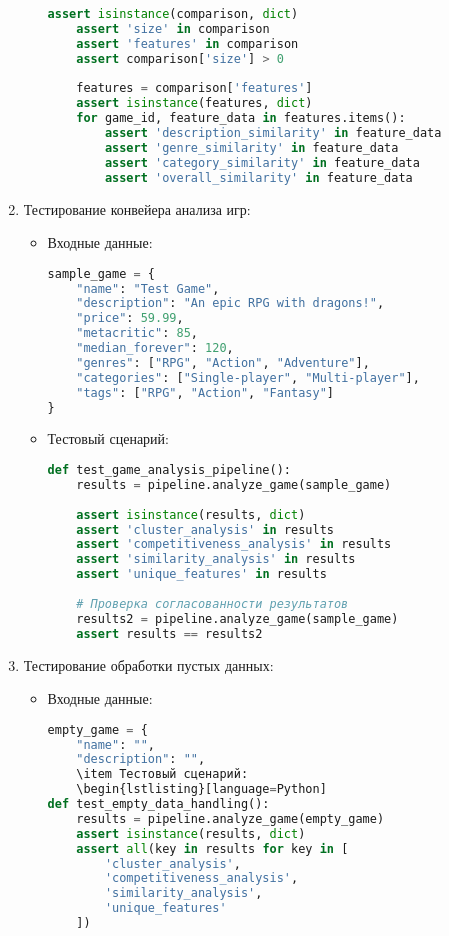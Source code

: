 \documentclass{article}
\begin{document}
\begin{enumerate}[label=\arabic*.]
\begin{itemize}
\begin{lstlisting}[language=Python]
    assert isinstance(comparison, dict)
    assert 'size' in comparison
    assert 'features' in comparison
    assert comparison['size'] > 0
    
    features = comparison['features']
    assert isinstance(features, dict)
    for game_id, feature_data in features.items():
        assert 'description_similarity' in feature_data
        assert 'genre_similarity' in feature_data
        assert 'category_similarity' in feature_data
        assert 'overall_similarity' in feature_data
        \end{lstlisting}
    \end{itemize}

    \item Тестирование конвейера анализа игр:
    \begin{itemize}
        \item Входные данные:
        \begin{lstlisting}[language=Python]
sample_game = {
    "name": "Test Game",
    "description": "An epic RPG with dragons!",
    "price": 59.99,
    "metacritic": 85,
    "median_forever": 120,
    "genres": ["RPG", "Action", "Adventure"],
    "categories": ["Single-player", "Multi-player"],
    "tags": ["RPG", "Action", "Fantasy"]
}
        \end{lstlisting}
        \item Тестовый сценарий:
        \begin{lstlisting}[language=Python]
def test_game_analysis_pipeline():
    results = pipeline.analyze_game(sample_game)
    
    assert isinstance(results, dict)
    assert 'cluster_analysis' in results
    assert 'competitiveness_analysis' in results
    assert 'similarity_analysis' in results
    assert 'unique_features' in results
    
    # Проверка согласованности результатов
    results2 = pipeline.analyze_game(sample_game)
    assert results == results2
        \end{lstlisting}
    \end{itemize}

    \item Тестирование обработки пустых данных:
    \begin{itemize}
        \item Входные данные:
        \begin{lstlisting}[language=Python]
empty_game = {
    "name": "",
    "description": "",
    \item Тестовый сценарий:
    \begin{lstlisting}[language=Python]
def test_empty_data_handling():
    results = pipeline.analyze_game(empty_game)
    assert isinstance(results, dict)
    assert all(key in results for key in [
        'cluster_analysis',
        'competitiveness_analysis',
        'similarity_analysis',
        'unique_features'
    ])
        \end{lstlisting}
    \end{itemize}


\end{enumerate}
\end{document}
